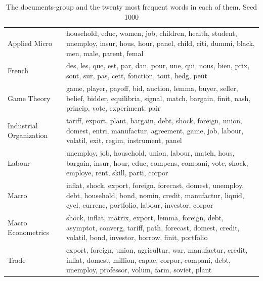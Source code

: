 \begin{table}[tb]
\caption[Groups]{The documents-group and the twenty most frequent words in each of them. Seed 1000}
\label{tab:groups}
\begin{tabularx}{\hsize}{lY}
\toprule
\midrule
Applied Micro & household, educ, women, job, children, health, student, unemploy, insur, hous, hour, panel, child, citi, dummi, black, men, male, parent, femal \\
French & des, les, que, est, par, dan, pour, une, qui, nous, bien, prix, sont, sur, pas, cett, fonction, tout, hedg, peut \\
Game Theory & game, player, payoff, bid, auction, lemma, buyer, seller, belief, bidder, equilibria, signal, match, bargain, finit, nash, princip, vote, experiment, pair \\
Industrial Organization & tariff, export, plant, bargain, debt, shock, foreign, union, domest, entri, manufactur, agreement, game, job, labour, volatil, exit, regim, instrument, panel \\
Labour & unemploy, job, household, union, labour, match, hous, bargain, insur, hour, educ, compens, compani, vote, shock, employe, rent, skill, parti, corpor \\
Macro & inflat, shock, export, foreign, forecast, domest, unemploy, debt, household, bond, nomin, credit, manufactur, liquid, cycl, currenc, portfolio, labour, investor, corpor \\
Macro Econometrics & shock, inflat, matrix, export, lemma, foreign, debt, asymptot, converg, tariff, path, forecast, domest, credit, volatil, bond, investor, borrow, finit, portfolio \\
Trade & export, foreign, union, agricultur, war, manufactur, credit, inflat, domest, million, capac, corpor, compani, debt, unemploy, professor, volum, farm, soviet, plant \\
\bottomrule
\end{tabularx}
\end{table}

